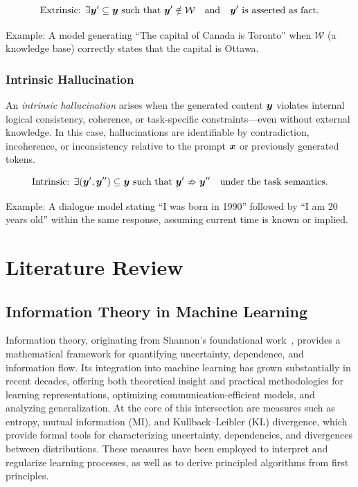 \documentclass[11pt, oneside]{book}
\theoremstyle{plain}
\theoremstyle{definition}
\theoremstyle{remark}
\begin{document}
\[
\text{Extrinsic: } \exists {\bm{y}}' \subseteq {\bm{y}} \text{ such that } {\bm{y}}' \notin \mathcal{W} \quad \text{and} \quad {\bm{y}}' \text{ is asserted as fact}.
\]

Example: A model generating ``The capital of Canada is Toronto'' when $\mathcal{W}$ (a knowledge base) correctly states that the capital is Ottawa.

\subsection*{Intrinsic Hallucination}

An \emph{intrinsic hallucination} arises when the generated content ${\bm{y}}$ violates internal logical consistency, coherence, or task-specific constraints—even without external knowledge. In this case, hallucinations are identifiable by contradiction, incoherence, or inconsistency relative to the prompt ${\bm{x}}$ or previously generated tokens.

\[
\text{Intrinsic: } \exists ({\bm{y}}', {\bm{y}}'') \subseteq {\bm{y}} \text{ such that } {\bm{y}}' \nRightarrow {\bm{y}}'' \quad \text{under the task semantics}.
\]

Example: A dialogue model stating ``I was born in 1990'' followed by ``I am 20 years old'' within the same response, assuming current time is known or implied.


\chapter{Literature Review}

\section{Information Theory in Machine Learning}

Information theory, originating from Shannon’s foundational work~\citep{shannon1948mathematical}, provides a mathematical framework for quantifying uncertainty, dependence, and information flow. Its integration into machine learning has grown substantially in recent decades, offering both theoretical insight and practical methodologies for learning representations, optimizing communication-efficient models, and analyzing generalization. At the core of this intersection are measures such as entropy, mutual information (MI), and Kullback–Leibler (KL) divergence, which provide formal tools for characterizing uncertainty, dependencies, and divergences between distributions. These measures have been employed to interpret and regularize learning processes, as well as to derive principled algorithms from first principles.
\end{document}
